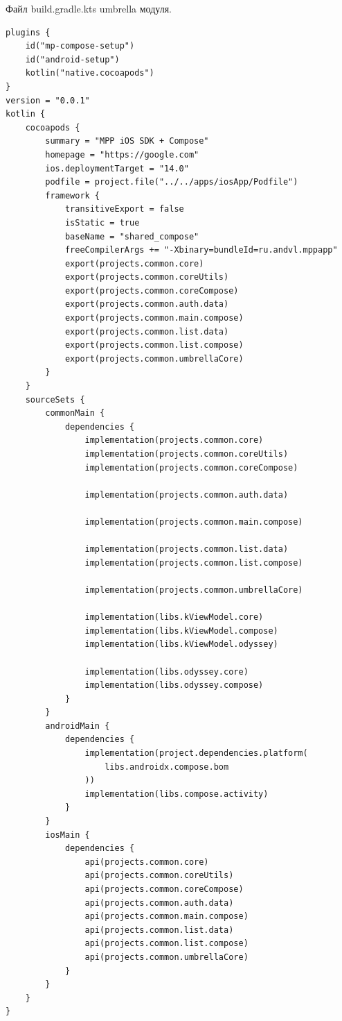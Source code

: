 \documentclass[14pt, russian]{scrartcl}
\newenvironment{longlisting}{\captionsetup{type=listing}}{}
\begin{document}
\begin{longlisting}
\caption{Файл build.gradle.kts umbrella модуля.}
\label{lst:umbrella-build-gradle}
\begin{verbatim}
plugins {
    id("mp-compose-setup")
    id("android-setup")
    kotlin("native.cocoapods")
}
version = "0.0.1"
kotlin {
    cocoapods {
        summary = "MPP iOS SDK + Compose"
        homepage = "https://google.com"
        ios.deploymentTarget = "14.0"
        podfile = project.file("../../apps/iosApp/Podfile")
        framework {
            transitiveExport = false
            isStatic = true
            baseName = "shared_compose"
            freeCompilerArgs += "-Xbinary=bundleId=ru.andvl.mppapp"
            export(projects.common.core)
            export(projects.common.coreUtils)
            export(projects.common.coreCompose)
            export(projects.common.auth.data)
            export(projects.common.main.compose)
            export(projects.common.list.data)
            export(projects.common.list.compose)
            export(projects.common.umbrellaCore)
        }
    }
    sourceSets {
        commonMain {
            dependencies {
                implementation(projects.common.core)
                implementation(projects.common.coreUtils)
                implementation(projects.common.coreCompose)

                implementation(projects.common.auth.data)

                implementation(projects.common.main.compose)

                implementation(projects.common.list.data)
                implementation(projects.common.list.compose)

                implementation(projects.common.umbrellaCore)

                implementation(libs.kViewModel.core)
                implementation(libs.kViewModel.compose)
                implementation(libs.kViewModel.odyssey)

                implementation(libs.odyssey.core)
                implementation(libs.odyssey.compose)
            }
        }
        androidMain {
            dependencies {
                implementation(project.dependencies.platform(
                    libs.androidx.compose.bom
                ))
                implementation(libs.compose.activity)
            }
        }
        iosMain {
            dependencies {
                api(projects.common.core)
                api(projects.common.coreUtils)
                api(projects.common.coreCompose)
                api(projects.common.auth.data)
                api(projects.common.main.compose)
                api(projects.common.list.data)
                api(projects.common.list.compose)
                api(projects.common.umbrellaCore)
            }
        }
    }
}
\end{verbatim}
\end{longlisting}
\end{document}
